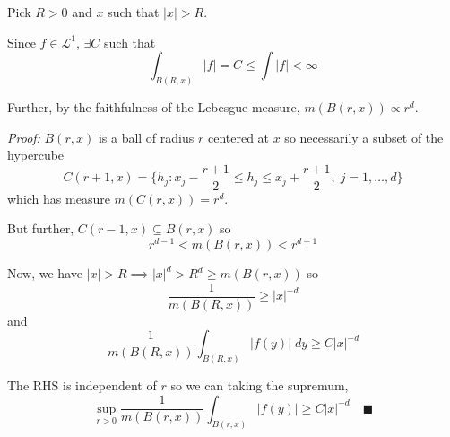 \documentclass[12pt]{article}
\newcommand{\qed}{\quad \blacksquare}
\newcommand{\abs}[1]{\left\vert #1 \right\vert}
\renewcommand{\L}{\mathcal{L}}
\newcommand{\sub}{\subseteq}
\newenvironment*{proof}[1][blue]{
\begin{tcolorbox}[
    parbox=false,
    colback=#1!5!white,
    colframe=#1!75!black,
    breakable
]}
{\end{tcolorbox}}
\begin{document}
    \color{blue}
        Pick $R > 0$ and $x$ such that $\abs{x} > R$.
        
        Since $f \in \L^1$, $\exists C$ such that 
        \[\int_{B(R, x)} \abs{f} = C \leq \int \abs{f} < \infty\]

        Further, by the faithfulness of the Lebesgue measure, $m(B(r, x)) \propto r^d$.

        \begin{proof}
            \emph{Proof:} $B(r, x)$ is a ball of radius $r$ centered at $x$ so necessarily a subset of the hypercube 
            \[C(r + 1, x) = \{h_j: x_j - \frac{r+1}{2}\leq h_j \leq x_j + \frac{r+1}{2}, \; j = 1, \dots, d\}\] 
            which has measure $m(C(r, x)) = r^d$.  

            But further, $C(r - 1, x) \sub B(r, x)$ so 
            \[r^{d-1} < m(B(r, x)) < r^{d+1}\]
        \end{proof}

        Now, we have $\abs{x} > R \implies \abs{x}^d > R^d \geq m(B(r, x))$ so 
        \[\frac{1}{m(B(R, x))} \geq \abs{x}^{-d}\]
        and 
        \[\frac{1}{m(B(R, x))} \int_{B(R,x)} \abs{f(y)}\; dy \geq C\abs{x}^{-d}\]

        The RHS is independent of $r$ so we can taking the supremum, 
        \[\sup_{r > 0} \frac{1}{m(B(r, x))} \int_{B(r, x)} \abs{f(y)} \geq C\abs{x}^{-d}\qed\]
    \color{black}


\pagebreak
\end{document}
